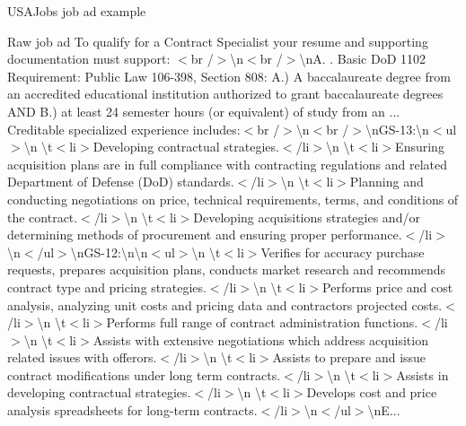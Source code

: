 \documentclass{beamer}
\begin{document}
\begin{frame}{USAJobs job ad example}
  \scriptsize
  \begin{exampleblock}{Raw job ad}
    To qualify for a Contract Specialist your resume and supporting documentation must support: $<$br /$>$\textbackslash n$<$br /$>$\textbackslash nA. . Basic DoD 1102 Requirement: Public Law 106-398, Section 808: A.) A baccalaureate degree from an accredited educational institution authorized to grant baccalaureate degrees AND B.) at least 24 semester hours (or equivalent) of study from an ... Creditable specialized experience includes:$<$br /$>$\textbackslash n$<$br /$>$\textbackslash nGS-13:\textbackslash n$<$ul$>$\textbackslash n \textbackslash t$<$li$>$Developing contractual strategies.$<$/li$>$\textbackslash n \textbackslash t$<$li$>$Ensuring acquisition plans are in full compliance with contracting regulations and related Department of Defense (DoD) standards.$<$/li$>$\textbackslash n \textbackslash t$<$li$>$Planning and conducting negotiations on price, technical requirements, terms, and conditions of the contract.$<$/li$>$\textbackslash n \textbackslash t$<$li$>$Developing acquisitions strategies and/or determining methods of procurement and ensuring proper performance.$<$/li$>$\textbackslash n$<$/ul$>$\textbackslash nGS-12:\textbackslash n\textbackslash n$<$ul$>$\textbackslash n \textbackslash t$<$li$>$Verifies for accuracy purchase requests, prepares acquisition plans, conducts market research and recommends contract type and pricing strategies.$<$/li$>$\textbackslash n \textbackslash t$<$li$>$Performs price and cost analysis, analyzing unit costs and pricing data and contractors projected costs.$<$/li$>$\textbackslash n \textbackslash t$<$li$>$Performs full range of contract administration functions.$<$/li$>$\textbackslash n \textbackslash t$<$li$>$Assists with extensive negotiations which address acquisition related issues with offerors.$<$/li$>$\textbackslash n \textbackslash t$<$li$>$Assists to prepare and issue contract modifications under long term contracts.$<$/li$>$\textbackslash n \textbackslash t$<$li$>$Assists in developing contractual strategies.$<$/li$>$\textbackslash n \textbackslash t$<$li$>$Develops cost and price analysis spreadsheets for long-term contracts.$<$/li$>$\textbackslash n$<$/ul$>$\textbackslash nE...      
  \end{exampleblock}
\end{frame}

\end{document}
